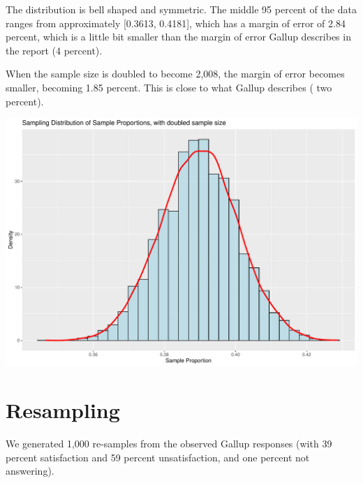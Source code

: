 \documentclass{article}\usepackage[]{graphicx}\usepackage[]{xcolor}
\newenvironment{Figure}
  {\par\medskip\noindent\minipage{\linewidth}}
  {\endminipage\par\medskip}
\begin{document}
\begin{multicols}{2}
The distribution is bell shaped and symmetric. The middle 95 percent of the data ranges from approximately [0.3613, 0.4181], which has a margin of error of 2.84 percent, which is a little bit smaller than the margin of error Gallup describes in the report (4 percent).

When the sample size is doubled to become 2,008, the margin of error becomes smaller, becoming 1.85 percent. This is close to what Gallup describes ( two percent).

\begin{Figure}
\includegraphics[width=\linewidth]{plot 2.pdf}
\end{Figure}

\section{Resampling}
We generated 1,000 re-samples from the observed Gallup responses (with 39 percent satisfaction and 59 percent unsatisfaction, and one percent not answering). 


\end{multicols}
\end{document}
